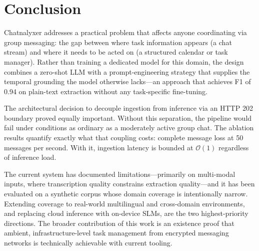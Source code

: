 \section{Conclusion}
\label{sec:conclusion}

Chatnalyxer addresses a practical problem that affects anyone coordinating via group messaging: the gap between where task information appears (a chat stream) and where it needs to be acted on (a structured calendar or task manager). Rather than training a dedicated model for this domain, the design combines a zero-shot LLM with a prompt-engineering strategy that supplies the temporal grounding the model otherwise lacks—an approach that achieves F1 of 0.94 on plain-text extraction without any task-specific fine-tuning.

The architectural decision to decouple ingestion from inference via an HTTP 202 boundary proved equally important. Without this separation, the pipeline would fail under conditions as ordinary as a moderately active group chat. The ablation results quantify exactly what that coupling costs: complete message loss at 50 messages per second. With it, ingestion latency is bounded at $\mathcal{O}(1)$ regardless of inference load.

The current system has documented limitations—primarily on multi-modal inputs, where transcription quality constrains extraction quality—and it has been evaluated on a synthetic corpus whose domain coverage is intentionally narrow. Extending coverage to real-world multilingual and cross-domain environments, and replacing cloud inference with on-device SLMs, are the two highest-priority directions. The broader contribution of this work is an existence proof that ambient, infrastructure-level task management from encrypted messaging networks is technically achievable with current tooling.
